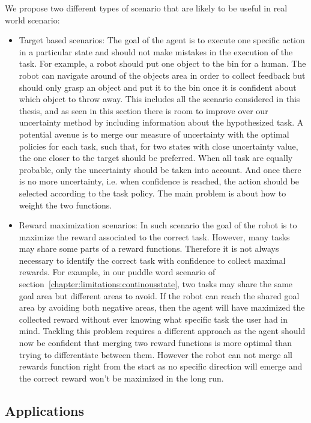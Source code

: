 We propose two different types of scenario that are likely to be useful in real world scenario: 
\begin{itemize}
\item Target based scenarios: The goal of the agent is to execute one specific action in a particular state and should not make mistakes in the execution of the task. For example, a robot should put one object to the bin for a human. The robot can navigate around of the objects area in order to collect feedback but should only grasp an object and put it to the bin once it is confident about which object to throw away. This includes all the scenario considered in this thesis, and as seen in this section there is room to improve over our uncertainty method by including information about the hypothesized task. A potential avenue is to merge our measure of uncertainty with the optimal policies for each task, such that, for two states with close uncertainty value, the one closer to the target should be preferred. When all task are equally probable, only the uncertainty should be taken into account. And once there is no more uncertainty, i.e. when confidence is reached, the action should be selected according to the task policy. The main problem is about how to weight the two functions.

\item Reward maximization scenarios: In such scenario the goal of the robot is to maximize the reward associated to the correct task. However, many tasks may share some parts of a reward functions. Therefore it is not always necessary to identify the correct task with confidence to collect maximal rewards. For example, in our puddle word scenario of section~\ref{chapter:limitations:continousstate}, two tasks may share the same goal area but different areas to avoid. If the robot can reach the shared goal area by avoiding both negative areas, then the agent will have maximized the collected reward without ever knowing what specific task the user had in mind. Tackling this problem requires a different approach as the agent should now be confident that merging two reward functions is more optimal than trying to differentiate between them. However the robot can not merge all rewards function right from the start as no specific direction will emerge and the correct reward won't be maximized in the long run.
\end{itemize}

\subsection{Applications}

